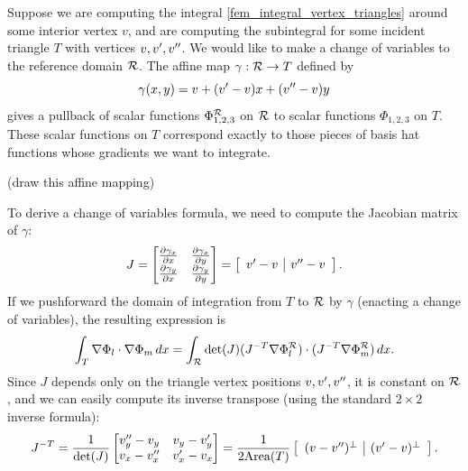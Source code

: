 Suppose we are computing the integral \eqref{fem_integral_vertex_triangles} around some interior vertex $v$,
and are computing the subintegral for some incident triangle $T$ with vertices $v,v^{\prime},v^{\prime\prime}$.
We would like to make a change of variables to the reference domain ${\mathcal{R}}$.
The affine map
\newcommand{\affmap}{\gamma}
$\affmap : \reftri \rightarrow T$ defined by
\begin{equation}\label{fem_affine_map}
    \affmap(x,y) = v + (v^\pr - v)x + (v^\ppr - v)y
\end{equation}
gives a pullback of scalar functions $\Phi^{\mathcal{R}}_{1,2,3}$ on ${\mathcal{R}}$
to scalar functions $\Phi_{1,2,3}$ on $T$. These scalar functions on $T$ correspond
exactly to those pieces of basis hat functions whose gradients we want to integrate.

\vskip 0.2in
(draw this affine mapping)
\vskip 0.2in

To derive a change of variables formula, we need to compute the Jacobian matrix of $\affmap$:
$$
    J = \begin{bmatrix} \Part{\affmap_x}{x} & \Part{\affmap_x}{y} \\ 
                        \Part{\affmap_y}{x} & \Part{\affmap_y}{y} \end{bmatrix}
      =
        \left[
        \begin{array}{c|c}
            v^\pr - v & v^\ppr - v
        \end{array}
        \right].
$$
If we pushforward the domain of integration from $T$ to ${\mathcal{R}}$ by $\affmap$ (enacting a change of variables),
the resulting expression is
\begin{equation}\label{fem_closed_form_integral_complicated}
    \int_T \nabla\Phi_l \cdot \nabla\Phi_m\,dx
        = \int_{\mathcal{R}} \det(J)(J^{-T}\nabla\Phi^{\mathcal{R}}_l)\cdot(J^{-T}\nabla\Phi^{\mathcal{R}}_m)\,dx.
\end{equation}
Since $J$ depends only on the triangle vertex positions $v,v^{\prime},v^{\prime\prime}$, it is constant on ${\mathcal{R}}$, and we can easily compute its inverse transpose
(using the standard $2 \times 2$ inverse formula):
\begin{align*}
    J^{-T} = \frac{1}{\det(J)}\begin{bmatrix}
        v_y^{\prime\prime} - v_y & v_y - v^{\prime}_y \\ v_x - v_x^{\prime\prime} & v^{\prime}_x - v_x
    \end{bmatrix}
    = \frac{1}{2\text{Area}(T)}\left[\begin{array}{c|c}
        (v - v^{\prime\prime})^\perp & (v^{\prime} - v)^\perp
    \end{array}\right].
\end{align*}

